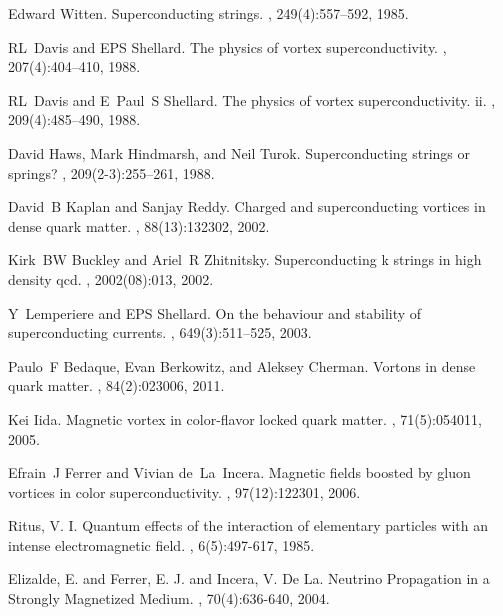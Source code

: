 \documentclass[12pt]{article}
\begin{document}
\begin{thebibliography}{99}
Edward Witten.
\newblock Superconducting strings.
, 249(4):557--592, 1985.

RL~Davis and EPS Shellard.
\newblock The physics of vortex superconductivity.
, 207(4):404--410, 1988.

RL~Davis and E~Paul~S Shellard.
\newblock The physics of vortex superconductivity. ii.
, 209(4):485--490, 1988.

David Haws, Mark Hindmarsh, and Neil Turok.
\newblock Superconducting strings or springs?
, 209(2-3):255--261, 1988.

David~B Kaplan and Sanjay Reddy.
\newblock Charged and superconducting vortices in dense quark matter.
, 88(13):132302, 2002.

Kirk~BW Buckley and Ariel~R Zhitnitsky.
\newblock Superconducting k strings in high density qcd.
, 2002(08):013, 2002.

Y~Lemperiere and EPS Shellard.
\newblock On the behaviour and stability of superconducting currents.
, 649(3):511--525, 2003.

Paulo~F Bedaque, Evan Berkowitz, and Aleksey Cherman.
\newblock Vortons in dense quark matter.
, 84(2):023006, 2011.

Kei Iida.
\newblock Magnetic vortex in color-flavor locked quark matter.
, 71(5):054011, 2005.

Efrain~J Ferrer and Vivian de~La~Incera.
\newblock Magnetic fields boosted by gluon vortices in color superconductivity.
, 97(12):122301, 2006.

Ritus, V. I.
\newblock Quantum effects of the interaction of elementary particles with an intense electromagnetic field.
, 6(5):497-617, 1985.


Elizalde, E. and Ferrer, E. J. and Incera, V. De La.
\newblock Neutrino Propagation in a Strongly Magnetized Medium.
, 70(4):636-640, 2004.




\end{thebibliography}
\end{document}
